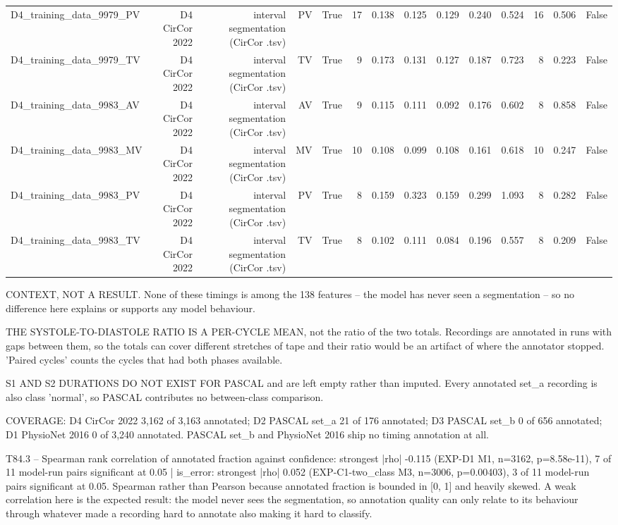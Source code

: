 \begin{table}[htbp]
\begin{tabular}{lrrrrrrrrrrrrr}
    D4\_training\_data\_9979\_PV & D4 CirCor 2022 & interval segmentation (CirCor .tsv) & PV & True & 17 & 0.138 & 0.125 & 0.129 & 0.240 & 0.524 & 16 & 0.506 & False \\
    D4\_training\_data\_9979\_TV & D4 CirCor 2022 & interval segmentation (CirCor .tsv) & TV & True & 9 & 0.173 & 0.131 & 0.127 & 0.187 & 0.723 & 8 & 0.223 & False \\
    D4\_training\_data\_9983\_AV & D4 CirCor 2022 & interval segmentation (CirCor .tsv) & AV & True & 9 & 0.115 & 0.111 & 0.092 & 0.176 & 0.602 & 8 & 0.858 & False \\
    D4\_training\_data\_9983\_MV & D4 CirCor 2022 & interval segmentation (CirCor .tsv) & MV & True & 10 & 0.108 & 0.099 & 0.108 & 0.161 & 0.618 & 10 & 0.247 & False \\
    D4\_training\_data\_9983\_PV & D4 CirCor 2022 & interval segmentation (CirCor .tsv) & PV & True & 8 & 0.159 & 0.323 & 0.159 & 0.299 & 1.093 & 8 & 0.282 & False \\
    D4\_training\_data\_9983\_TV & D4 CirCor 2022 & interval segmentation (CirCor .tsv) & TV & True & 8 & 0.102 & 0.111 & 0.084 & 0.196 & 0.557 & 8 & 0.209 & False \\
    \bottomrule
  \end{tabular}
  \par\footnotesize CONTEXT, NOT A RESULT. None of these timings is among the 138 features -- the model has never seen a segmentation -- so no difference here explains or supports any model behaviour.
  \par\footnotesize THE SYSTOLE-TO-DIASTOLE RATIO IS A PER-CYCLE MEAN, not the ratio of the two totals. Recordings are annotated in runs with gaps between them, so the totals can cover different stretches of tape and their ratio would be an artifact of where the annotator stopped. 'Paired cycles' counts the cycles that had both phases available.
  \par\footnotesize S1 AND S2 DURATIONS DO NOT EXIST FOR PASCAL and are left empty rather than imputed. Every annotated set\_a recording is also class 'normal', so PASCAL contributes no between-class comparison.
  \par\footnotesize COVERAGE: D4 CirCor 2022 3,162 of 3,163 annotated; D2 PASCAL set\_a 21 of 176 annotated; D3 PASCAL set\_b 0 of 656 annotated; D1 PhysioNet 2016 0 of 3,240 annotated. PASCAL set\_b and PhysioNet 2016 ship no timing annotation at all.
  \par\footnotesize T84.3 -- Spearman rank correlation of annotated fraction against confidence: strongest |rho| -0.115 (EXP-D1 M1, n=3162, p=8.58e-11), 7 of 11 model-run pairs significant at 0.05 | is\_error: strongest |rho| 0.052 (EXP-C1-two\_class M3, n=3006, p=0.00403), 3 of 11 model-run pairs significant at 0.05. Spearman rather than Pearson because annotated fraction is bounded in [0, 1] and heavily skewed. A weak correlation here is the expected result: the model never sees the segmentation, so annotation quality can only relate to its behaviour through whatever made a recording hard to annotate also making it hard to classify.

\end{table}
